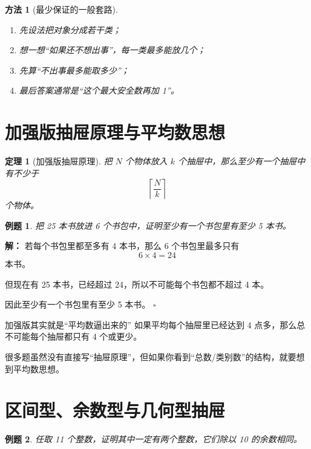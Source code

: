 \documentclass[11pt,a4paper,fontset=fandol]{ctexart}
\theoremstyle{formaltheorem}
\newtheorem{theorem}{定理}[section]
\newtheorem{method}{方法}[section]
\theoremstyle{formalexample}
\newtheorem{example}{例题}[section]
\newenvironment{solution}{\par\noindent\textbf{解：}}{\hfill$\square$\par}
\begin{document}
\begin{method}[最少保证的一般套路]
\begin{enumerate}
  \item 先设法把对象分成若干类；
  \item 想一想“如果还不想出事”，每一类最多能放几个；
  \item 先算“不出事最多能取多少”；
  \item 最后答案通常是“这个最大安全数再加 1”。
\end{enumerate}
\end{method}

\section{加强版抽屉原理与平均数思想}

\begin{theorem}[加强版抽屉原理]
把 $N$ 个物体放入 $k$ 个抽屉中，那么至少有一个抽屉中有不少于
\[
\left\lceil \frac{N}{k} \right\rceil
\]
个物体。
\end{theorem}

\begin{example}
把 25 本书放进 6 个书包中，证明至少有一个书包里有至少 5 本书。
\end{example}

\begin{solution}
若每个书包里都至多有 4 本书，那么 6 个书包里最多只有
\[
6\times 4=24
\]
本书。

但现在有 25 本书，已经超过 24，所以不可能每个书包都不超过 4 本。

因此至少有一个书包里有至少 5 本书。
\end{solution}

\begin{skillbox}{加强版其实就是“平均数逼出来的”}
如果平均每个抽屉里已经达到 $4$ 点多，那么总不可能每个抽屉都只有 4 个或更少。

很多题虽然没有直接写“抽屉原理”，但如果你看到“总数/类别数”的结构，就要想到平均数思想。
\end{skillbox}

\section{区间型、余数型与几何型抽屉}

\begin{example}
任取 11 个整数，证明其中一定有两个整数，它们除以 10 的余数相同。
\end{example}
\end{document}
